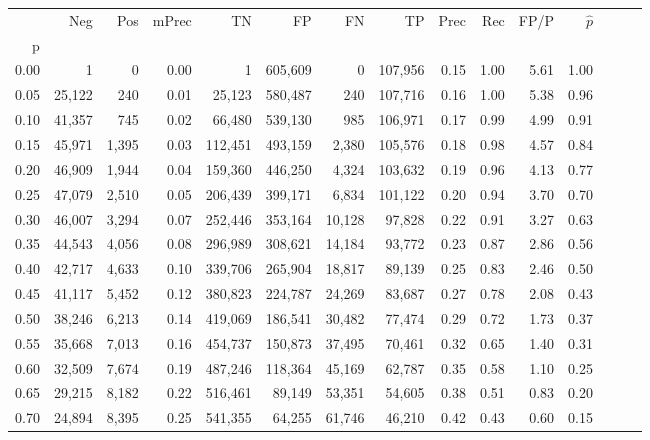 \begin{tabular}{rrrrrrrrrrrrrrr}
\toprule
{} &     Neg &    Pos & mPrec &       TN &       FP &       FN &       TP &  Prec &   Rec &  FP/P & $\hat{p}$ \\
p    &         &        &       &          &          &          &          &       &       &       &           \\
\midrule
0.00 &       1 &      0 &  0.00 &        1 &  605,609 &        0 &  107,956 &  0.15 &  1.00 &  5.61 &      1.00 \\
0.05 &  25,122 &    240 &  0.01 &   25,123 &  580,487 &      240 &  107,716 &  0.16 &  1.00 &  5.38 &      0.96 \\
0.10 &  41,357 &    745 &  0.02 &   66,480 &  539,130 &      985 &  106,971 &  0.17 &  0.99 &  4.99 &      0.91 \\
0.15 &  45,971 &  1,395 &  0.03 &  112,451 &  493,159 &    2,380 &  105,576 &  0.18 &  0.98 &  4.57 &      0.84 \\
0.20 &  46,909 &  1,944 &  0.04 &  159,360 &  446,250 &    4,324 &  103,632 &  0.19 &  0.96 &  4.13 &      0.77 \\
0.25 &  47,079 &  2,510 &  0.05 &  206,439 &  399,171 &    6,834 &  101,122 &  0.20 &  0.94 &  3.70 &      0.70 \\
0.30 &  46,007 &  3,294 &  0.07 &  252,446 &  353,164 &   10,128 &   97,828 &  0.22 &  0.91 &  3.27 &      0.63 \\
0.35 &  44,543 &  4,056 &  0.08 &  296,989 &  308,621 &   14,184 &   93,772 &  0.23 &  0.87 &  2.86 &      0.56 \\
0.40 &  42,717 &  4,633 &  0.10 &  339,706 &  265,904 &   18,817 &   89,139 &  0.25 &  0.83 &  2.46 &      0.50 \\
0.45 &  41,117 &  5,452 &  0.12 &  380,823 &  224,787 &   24,269 &   83,687 &  0.27 &  0.78 &  2.08 &      0.43 \\
0.50 &  38,246 &  6,213 &  0.14 &  419,069 &  186,541 &   30,482 &   77,474 &  0.29 &  0.72 &  1.73 &      0.37 \\
0.55 &  35,668 &  7,013 &  0.16 &  454,737 &  150,873 &   37,495 &   70,461 &  0.32 &  0.65 &  1.40 &      0.31 \\
0.60 &  32,509 &  7,674 &  0.19 &  487,246 &  118,364 &   45,169 &   62,787 &  0.35 &  0.58 &  1.10 &      0.25 \\
0.65 &  29,215 &  8,182 &  0.22 &  516,461 &   89,149 &   53,351 &   54,605 &  0.38 &  0.51 &  0.83 &      0.20 \\
0.70 &  24,894 &  8,395 &  0.25 &  541,355 &   64,255 &   61,746 &   46,210 &  0.42 &  0.43 &  0.60 &      0.15 \\

\end{tabular}
